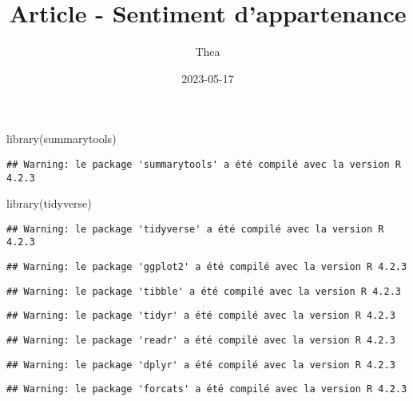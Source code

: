 \documentclass[
]{article}
\title{Article - Sentiment d'appartenance}
\author{Thea}
\date{2023-05-17}
\newenvironment{Shaded}{\begin{snugshade}}{\end{snugshade}}
\newcommand{\FunctionTok}[1]{\textcolor[rgb]{0.00,0.00,0.00}{#1}}
\newcommand{\NormalTok}[1]{#1}
\begin{document}
\maketitle

\begin{Shaded}
\begin{Highlighting}[]
\FunctionTok{library}\NormalTok{(summarytools)}
\end{Highlighting}
\end{Shaded}

\begin{verbatim}
## Warning: le package 'summarytools' a été compilé avec la version R 4.2.3
\end{verbatim}

\begin{Shaded}
\begin{Highlighting}[]
\FunctionTok{library}\NormalTok{(tidyverse)}
\end{Highlighting}
\end{Shaded}

\begin{verbatim}
## Warning: le package 'tidyverse' a été compilé avec la version R 4.2.3
\end{verbatim}

\begin{verbatim}
## Warning: le package 'ggplot2' a été compilé avec la version R 4.2.3
\end{verbatim}

\begin{verbatim}
## Warning: le package 'tibble' a été compilé avec la version R 4.2.3
\end{verbatim}

\begin{verbatim}
## Warning: le package 'tidyr' a été compilé avec la version R 4.2.3
\end{verbatim}

\begin{verbatim}
## Warning: le package 'readr' a été compilé avec la version R 4.2.3
\end{verbatim}

\begin{verbatim}
## Warning: le package 'dplyr' a été compilé avec la version R 4.2.3
\end{verbatim}

\begin{verbatim}
## Warning: le package 'forcats' a été compilé avec la version R 4.2.3
\end{verbatim}
\end{document}
